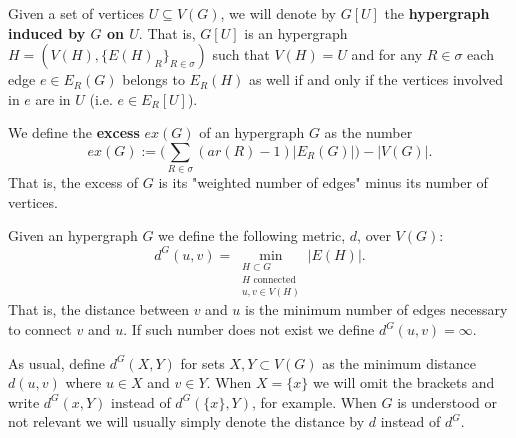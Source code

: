 \documentclass[12pt,notitlepage,a4paper]{article}
\theoremstyle{definition}
\begin{document}
Given a set of vertices $U\subseteq V(G)$, 
we will denote by $G[U]$ the \textbf{hypergraph induced
by $G$ on $U$}. That is, $G[U]$ is an hypergraph
$H=(V(H),\{E(H)_R\}_{R\in \sigma})$ such that 
$V(H)=U$ and for any $R\in \sigma$ 
each edge $e\in E_R(G)$ belongs 
to $E_R(H)$ as well if and only if the vertices
involved in $e$ are in $U$ (i.e. $e\in E_R[U]$).
\par
%
%

%


We define the \textbf{excess} $ex(G)$ of an hypergraph $G$ as the number
\[
ex(G):= \big(\sum_{R\in \sigma} (ar(R)-1)|E_R(G)|\big) - |V(G)|.  
\] 
That is, the excess of $G$ is its "weighted number of edges"
minus its number of vertices. \par

Given an hypergraph $G$ we define the following metric, $d$, over $V(G)$:
\[ d^G(u,v)= \min_{\substack{H \subset G\\ 
		H \text{ connected }\\
		u,v\in V(H)}} |E(H)| .\]
That is, the distance between $v$ and $u$ is the minimum number of
edges necessary to connect $v$ and $u$. 
If such number does not exist we define $d^G(u,v)=\infty$. \par
As usual, define $d^{G}(X,Y)$ for sets $X,Y\subset V(G)$ as the minimum
distance $d(u,v)$ where $u\in X$ and $v\in Y$. 
When $X=\{x\}$ we will omit the brackets and write
$d^G(x,Y)$ instead of $d^G(\{x\},Y)$, for example.
When $G$ 
is understood or not relevant we will usually simply denote the 
distance by $d$ instead of $d^G$. \par
\end{document}

